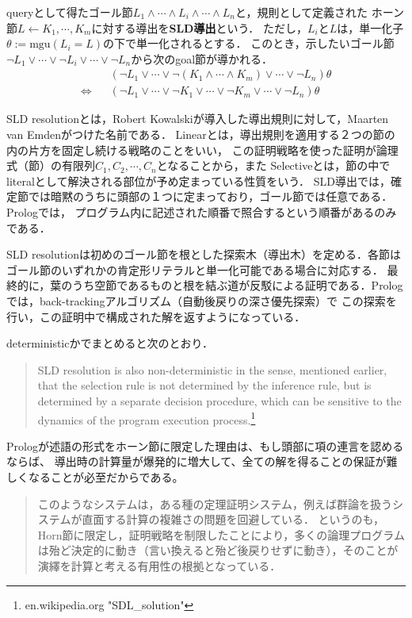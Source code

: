 \documentclass[uplatex, 12pt, dvipdfmx]{jsreport}
\begin{document}
\begin{definition}\label{def-SLD-solution}
    queryとして得たゴール節$L_1\land\cdots\land L_i\land\cdots\land L_n$と，規則として定義された
    ホーン節$L\leftarrow K_1,\cdots,K_m$に対する導出を\textbf{SLD導出}という．
    ただし，$L_i$と$L$は，単一化子$\theta:=\mathrm{mgu}(L_i=L)$の下で単一化されるとする．
    このとき，示したいゴール節$\lnot L_1\lor\cdots\lor \lnot L_i\lor\cdots\lor \lnot L_n$から次のgoal節が導かれる．
    \begin{align*}
        &(\lnot L_1\lor\cdots\lor \lnot(K_1\land\cdots\land K_m) \lor\cdots\lor \lnot L_n)\theta \\
        \Longleftrightarrow\;\;\;&(\lnot L_1\lor\cdots\lor \lnot K_1\lor\cdots\lor\lnot K_m \lor\cdots\lor \lnot L_n)\theta
    \end{align*}
\end{definition}
\begin{remark}
    SLD resolutionとは，Robert Kowalskiが導入した導出規則に対して，Maarten van Emdenがつけた名前である\cite{SLD-resolution}．
    Linearとは，導出規則を適用する２つの節の内の片方を固定し続ける戦略のことをいい，
    この証明戦略を使った証明が論理式（節）の有限列$C_1,C_2,\cdots,C_n$となることから，また
    Selectiveとは，節の中でliteralとして解決される部位が予め定まっている性質をいう．
    SLD導出では，確定節では暗黙のうちに頭部の１つに定まっており，ゴール節では任意である．Prologでは，
    プログラム内に記述された順番で照合するという順番があるのみである．

    SLD resolutionは初めのゴール節を根とした探索木（導出木）を定める．各節はゴール節のいずれかの肯定形リテラルと単一化可能である場合に対応する．
    最終的に，葉のうち空節であるものと根を結ぶ道が反駁による証明である．Prologでは，back-trackingアルゴリズム（自動後戻りの深さ優先探索）で
    この探索を行い，この証明中で構成された解を返すようになっている．

    deterministicかでまとめると次のとおり．
    \begin{quote}
        SLD resolution is also non-deterministic in the sense, mentioned earlier, that the selection rule is not determined by the inference rule, but is determined by a separate decision procedure, which can be sensitive to the dynamics of the program execution process.\footnote{en.wikipedia.org "SDL\_solution"}
    \end{quote}
    Prologが述語の形式をホーン節に限定した理由は、もし頭部に項の連言を認めるならば、
    導出時の計算量が爆発的に増大して、全ての解を得ることの保証が難しくなることが必至だからである。
    \begin{quote}
        このようなシステムは，ある種の定理証明システム，例えば群論を扱うシステムが直面する計算の複雑さの問題を回避している．
        というのも，Horn節に限定し，証明戦略を制限したことにより，多くの論理プログラムは殆ど決定的に動き（言い換えると殆ど後戻りせずに動き），そのことが演繹を計算と考える有用性の根拠となっている\cite{論理プログラミングの基礎}．
    \end{quote}
\end{remark}
\end{document}
